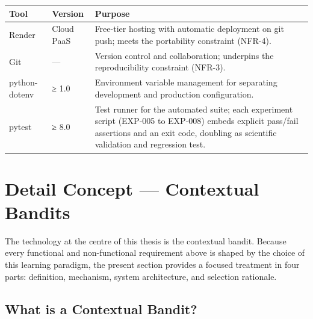 {\def\LTcaptype{none} %
\begin{longtable}[]{@{}
  >{\raggedright\arraybackslash}p{}
  >{\raggedright\arraybackslash}p{}
  >{\raggedright\arraybackslash}p{}@{}}
\toprule\noalign{}
\begin{minipage}[b]{\linewidth}\raggedright
Tool
\end{minipage} & \begin{minipage}[b]{\linewidth}\raggedright
Version
\end{minipage} & \begin{minipage}[b]{\linewidth}\raggedright
Purpose
\end{minipage} \\
\midrule\noalign{}
\endhead
\bottomrule\noalign{}
\endlastfoot
Render & Cloud PaaS & Free-tier hosting with automatic deployment on git push; meets the portability constraint (NFR-4). \\
Git & --- & Version control and collaboration; underpins the reproducibility constraint (NFR-3). \\
python-dotenv & ≥ 1.0 & Environment variable management for separating development and production configuration. \\
pytest & ≥ 8.0 & Test runner for the automated suite; each experiment script (EXP-005 to EXP-008) embeds explicit pass/fail assertions and an exit code, doubling as scientific validation and regression test. \\
\end{longtable}
}

\section{Detail Concept --- Contextual Bandits}\label{detail-concept-contextual-bandits}

The technology at the centre of this thesis is the contextual bandit. Because every functional and non-functional requirement above is shaped by the choice of this learning paradigm, the present section provides a focused treatment in four parts: definition, mechanism, system architecture, and selection rationale.

\subsection{What is a Contextual Bandit?}\label{what-is-a-contextual-bandit}

